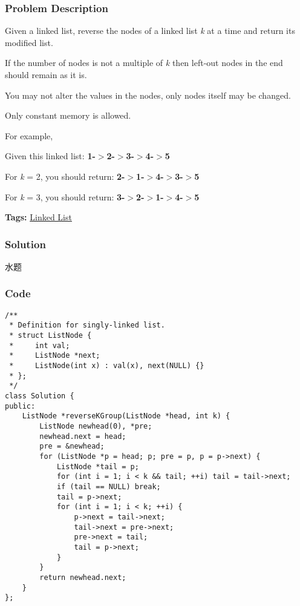 \documentclass{article}
\begin{document}
\begin{CJK*}{UTF8}{gkai}
\subsubsection*{Problem Description}
Given a linked list, reverse the nodes of a linked list \emph{k} at a time and return its modified list.

If the number of nodes is not a multiple of \emph{k} then left-out nodes in the end should remain as it is.

You may not alter the values in the nodes, only nodes itself may be changed.

Only constant memory is allowed.

For example,


Given this linked list: \textbf{1-$>$2-$>$3-$>$4-$>$5}

For \emph{k} = 2, you should return: \textbf{2-$>$1-$>$4-$>$3-$>$5}

For \emph{k} = 3, you should return: \textbf{3-$>$2-$>$1-$>$4-$>$5}


\textbf{Tags: }
\hyperref[ Linked List ]{ Linked List }



\subsubsection*{Solution}
水题

\subsubsection*{Code}
\begin{lstlisting}
/**
 * Definition for singly-linked list.
 * struct ListNode {
 *     int val;
 *     ListNode *next;
 *     ListNode(int x) : val(x), next(NULL) {}
 * };
 */
class Solution {
public:
    ListNode *reverseKGroup(ListNode *head, int k) {
        ListNode newhead(0), *pre;
        newhead.next = head;
        pre = &newhead;
        for (ListNode *p = head; p; pre = p, p = p->next) {
            ListNode *tail = p;
            for (int i = 1; i < k && tail; ++i) tail = tail->next;
            if (tail == NULL) break;
            tail = p->next;
            for (int i = 1; i < k; ++i) {
                p->next = tail->next;
                tail->next = pre->next;
                pre->next = tail;
                tail = p->next;
            }
        }
        return newhead.next;
    }
}; 
\end{lstlisting}



\end{CJK*}
\end{document}
